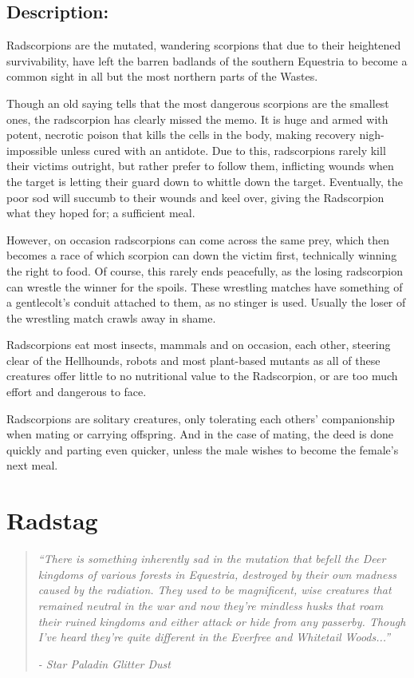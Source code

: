 \documentclass[11pt,a4paper,twocolumn]{book}
\begin{document}
	\subsection*{Description:}
	Radscorpions are the mutated, wandering scorpions that due to their heightened survivability, have left the barren badlands of the southern Equestria to become a common sight in all but the most northern parts of the Wastes.
	
	Though an old saying tells that the most dangerous scorpions are the smallest ones, the radscorpion has clearly missed the memo. It is huge and armed with potent, necrotic poison that kills the cells in the body, making recovery nigh-impossible unless cured with an antidote. 
	Due to this, radscorpions rarely kill their victims outright, but rather prefer to follow them, inflicting wounds when the target is letting their guard down to whittle down the target. Eventually, the poor sod will succumb to their wounds and keel over, giving the Radscorpion what they hoped for; a sufficient meal.
	
	However, on occasion radscorpions can come across the same prey, which then becomes a race of which scorpion can down the victim first, technically winning the right to food. Of course, this rarely ends peacefully, as the losing radscorpion can wrestle the winner for the spoils. These wrestling matches have something of a gentlecolt's conduit attached to them, as no stinger is used. Usually the loser of the wrestling match crawls away in shame.
	
	Radscorpions eat most insects, mammals and on occasion, each other, steering clear of the Hellhounds, robots and most plant-based mutants as all of these creatures offer little to no nutritional value to the Radscorpion, or are too much effort and dangerous to face.
	
	Radscorpions are solitary creatures, only tolerating each others' companionship when mating or carrying offspring. And in the case of mating, the deed is done quickly and parting even quicker, unless the male wishes to become the female's next meal. 
	
	
	
	
	
	\clearpage
	
	\section*{Radstag}
	\begin{quote}
		\emph{``There is something inherently sad in the mutation that befell the Deer kingdoms of various forests in Equestria, destroyed by their own madness caused by the radiation. They used to be magnificent, wise creatures that remained neutral in the war and now they're mindless husks that roam their ruined kingdoms and either attack or hide from any passerby. Though I've heard they're quite different in the Everfree and Whitetail Woods...''}
		
		\emph{-	Star Paladin Glitter Dust}
	\end{quote}
	
\end{document}
